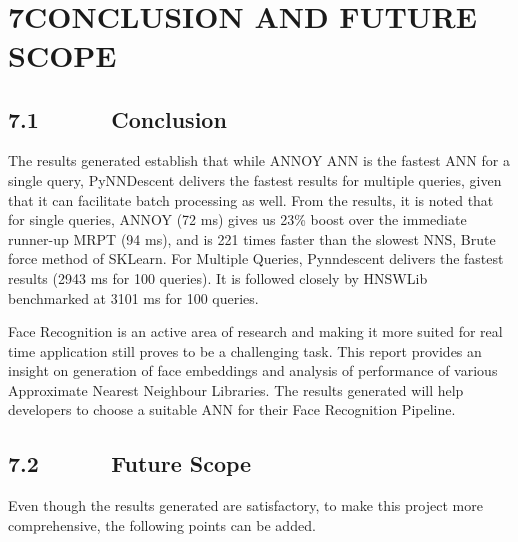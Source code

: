 \documentclass[12pt]{article}
\renewcommand{\_}{\kern-1.5pt\textunderscore\kern-1.5pt}
\begin{document}

\\

\section*{7\hspace*{10pt}CONCLUSION AND FUTURE SCOPE}
\subsection*{7.1\ \ \ \ \ \  Conclusion}
The results generated establish that while ANNOY ANN is the fastest ANN for a single query, PyNNDescent delivers the fastest results for multiple queries, given that it can facilitate batch processing as well. From the results, it is noted that for single queries, ANNOY \cite{annoy} (72 ms) gives us 23\% boost over the immediate runner-up MRPT \cite{hyvonen2015fast} (94 ms), and is 221 times faster than the slowest NNS, Brute force method of SKLearn. For Multiple Queries, Pynndescent  \cite{dong2011efficient} delivers the fastest results (2943 ms for 100 queries). It is followed closely by HNSWLib \cite{malkov2018efficient} benchmarked at 3101 ms for 100 queries.\par
Face Recognition is an active area of research and making it more suited for real time application still proves to be a challenging task. This report provides an insight on generation of face embeddings and analysis of performance of various Approximate Nearest Neighbour Libraries.  The results generated will help developers to choose a suitable ANN for their Face Recognition Pipeline.\par

 \par

\subsection*{7.2\ \ \ \ \ \  Future Scope}
\begin{justify}
Even though the results generated are satisfactory, to make this project more comprehensive, the following points can be added.
\end{justify}\par
\end{document}
